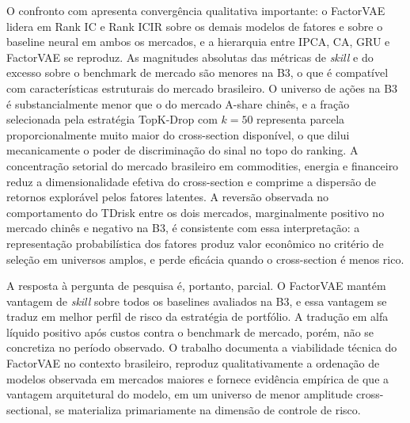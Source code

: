 O confronto com \textcite{duan2022} apresenta convergência qualitativa importante: o FactorVAE lidera em Rank IC e Rank ICIR sobre os demais modelos de fatores e sobre o baseline neural em ambos os mercados, e a hierarquia entre IPCA, CA, GRU e FactorVAE se reproduz. As magnitudes absolutas das métricas de \textit{skill} e do excesso sobre o benchmark de mercado são menores na B3, o que é compatível com características estruturais do mercado brasileiro. O universo de ações na B3 é substancialmente menor que o do mercado A-share chinês, e a fração selecionada pela estratégia TopK-Drop com $k = 50$ representa parcela proporcionalmente muito maior do cross-section disponível, o que dilui mecanicamente o poder de discriminação do sinal no topo do ranking. A concentração setorial do mercado brasileiro em commodities, energia e financeiro reduz a dimensionalidade efetiva do cross-section e comprime a dispersão de retornos explorável pelos fatores latentes. A reversão observada no comportamento do TDrisk entre os dois mercados, marginalmente positivo no mercado chinês e negativo na B3, é consistente com essa interpretação: a representação probabilística dos fatores produz valor econômico no critério de seleção em universos amplos, e perde eficácia quando o cross-section é menos rico.

A resposta à pergunta de pesquisa é, portanto, parcial. O FactorVAE mantém vantagem de \textit{skill} sobre todos os baselines avaliados na B3, e essa vantagem se traduz em melhor perfil de risco da estratégia de portfólio. A tradução em alfa líquido positivo após custos contra o benchmark de mercado, porém, não se concretiza no período observado. O trabalho documenta a viabilidade técnica do FactorVAE no contexto brasileiro, reproduz qualitativamente a ordenação de modelos observada em mercados maiores e fornece evidência empírica de que a vantagem arquitetural do modelo, em um universo de menor amplitude cross-sectional, se materializa primariamente na dimensão de controle de risco.